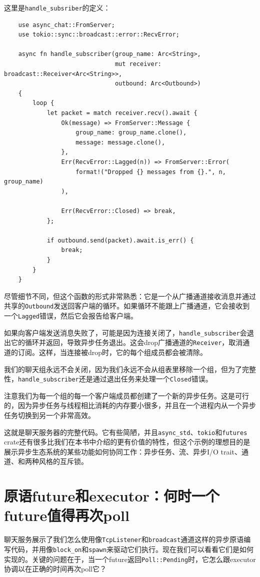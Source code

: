 这里是\texttt{handle\_subsriber}的定义：
\begin{verbatim}
    use async_chat::FromServer;
    use tokio::sync::broadcast::error::RecvError;

    async fn handle_subscriber(group_name: Arc<String>,
                               mut receiver: broadcast::Receiver<Arc<String>>,
                               outbound: Arc<Outbound>)
    {
        loop {
            let packet = match receiver.recv().await {
                Ok(message) => FromServer::Message {
                    group_name: group_name.clone(),
                    message: message.clone(),
                },
                Err(RecvError::Lagged(n)) => FromServer::Error(
                    format!("Dropped {} messages from {}.", n, group_name)
                ),

                Err(RecvError::Closed) => break,
            };

            if outbound.send(packet).await.is_err() {
                break; 
            }
        }
    }
\end{verbatim}

尽管细节不同，但这个函数的形式非常熟悉：它是一个从广播通道接收消息并通过共享的\texttt{Outbound}发送回客户端的循环。如果循环不能跟上广播通道，它会接收到一个\texttt{Lagged}错误，然后它会报告给客户端。

如果向客户端发送消息失败了，可能是因为连接关闭了，\texttt{handle\_subscriber}会退出它的循环并返回，导致异步任务退出。这会drop广播通道的\texttt{Receiver}，取消通道的订阅。这样，当连接被drop时，它的每个组成员都会被清除。

我们的聊天组永远不会关闭，因为我们永远不会从组表里移除一个组，但为了完整性，\texttt{handle\_subscriber}还是通过退出任务来处理一个\texttt{Closed}错误。

注意我们为每一个组的每一个客户端成员都创建了一个新的异步任务。这是可行的，因为异步任务与线程相比消耗的内存要小很多，并且在一个进程内从一个异步任务切换到另一个非常高效。

这就是聊天服务器的完整代码。它有些简陋，并且\texttt{async\_std}、\texttt{tokio}和\texttt{futures} crate还有很多比我们在本书中介绍的更有价值的特性，但这个示例的理想目的是展示异步生态系统的某些功能如何协同工作：异步任务、流、异步I/O trait、通道、和两种风格的互斥锁。

\section{原语future和executor：何时一个future值得再次poll}\label{WhenPoll}
聊天服务展示了我们怎么使用像\texttt{TcpListener}和\texttt{broadcast}通道这样的异步原语编写代码，并用像\texttt{block\_on}和\texttt{spawn}来驱动它们执行。现在我们可以看看它们是如何实现的。关键的问题在于，当一个future返回\texttt{Poll::Pending}时，它怎么跟executor协调以在正确的时间再次poll它？

